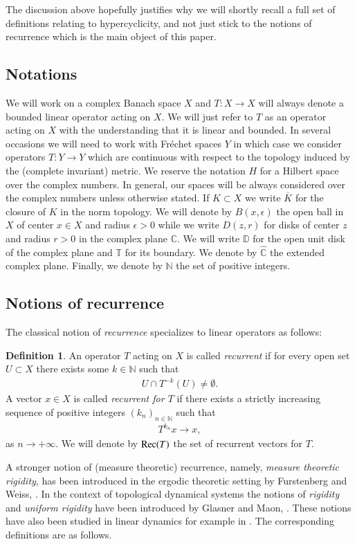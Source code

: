 \documentclass[12pt,leqno]{amsart}
\theoremstyle{plain}
\theoremstyle{definition}
\newtheorem{definition}[equation]{Definition}
\numberwithin{equation}{section}
\begin{document}
The discussion above hopefully justifies why we will shortly recall a full set of definitions relating to hypercyclicity, and not just stick to the notions of recurrence which is the main object of this paper.

\subsection*{Notations} We will work on a complex Banach space $X$ and $T:X\to X$ will always denote a bounded linear operator acting on $X$. We will just refer to $T$ as an operator acting on $X$ with the understanding that it is linear and bounded. In several occasions we will need to work with Fr\'echet spaces $Y$ in which case we consider operators $T:Y\to Y$ which are continuous with respect to the topology induced by the (complete invariant) metric. We reserve the notation $H$ for a Hilbert space over the complex numbers. In general, our spaces will be always considered over the complex numbers unless otherwise stated. If $K\subset X$ we write $\overline{K}$ for the closure of $K$ in the norm topology.  We will denote by $B(x,\epsilon)$ the open ball in $X$ of center $x\in X$ and radius $\epsilon>0$ while we write $D(z,r)$ for disks of center $z$ and radius $r>0$ in the complex plane $\mathbb C$. We will write $\mathbb D$ for the open unit disk of the complex plane and $ \mathbb T$ for its boundary. We denote by $\hat{\mathbb C}$ the extended complex plane. Finally, we denote by $\mathbb N$ the set of positive integers.

\subsection*{Notions of recurrence} The classical notion of \emph{recurrence} specializes to linear operators as follows:
\begin{definition}\label{d.rec}
	An operator $T$ acting on $X$ is called \emph{recurrent} if for every open set $U\subset X$ there exists some $k\in\mathbb N$ such that 
	\begin{align*}
		U\cap T^{-k}(U)\neq \emptyset . 
	\end{align*}
	A vector $x\in X$ is called \emph{recurrent for $T$} if there exists a strictly increasing sequence of positive integers $(k_n)_{n\in\mathbb N}$ such that 
	\begin{align*}
		T^{k_n}x\to x, 
	\end{align*}
	as $n\to+\infty$. We will denote by ${\textnormal{Rec}}(T)$ the set of recurrent vectors for $T$. 
\end{definition}
A stronger notion of (measure theoretic) recurrence, namely, \emph{measure theoretic rigidity}, has been introduced in the ergodic theoretic setting by Furstenberg and Weiss, \cite{FurWeiss}. In the context of topological dynamical systems the notions of \emph{rigidity} and \emph{uniform rigidity} have been introduced by Glasner and Maon, \cite{GM}. These notions have also been studied in linear dynamics for example in \cites{EISGRI,EIS}. The corresponding definitions are as follows.
\end{document}
